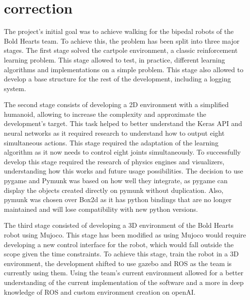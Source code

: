 \documentclass[12pt, a4paper]{article}
\begin{document}
\section{correction}
The project's initial goal was to achieve walking for the bipedal robots of the Bold Hearts team. 
To achieve this, the problem has been split into three major stages. The first stage solved the cartpole environment, a classic reinforcement learning problem.
This stage allowed to test, in practice, different learning algorithms and implementations on a simple problem. 
This stage also allowed to develop a base structure for the rest of the development, including a logging system.

The second stage consists of developing a 2D environment with a simplified humanoid, allowing to increase the complexity and approximate the development's target.
This task helped to better understand the Keras API and neural networks as it required research to understand how to output eight simultaneous actions.
This stage required the adaptation of the learning algorithm as it now needs to control eight joints simultaneously.
To successfully develop this stage required the research of physics engines and visualizers, understanding how this works and future usage possibilities. 
The decision to use pygame and Pymunk was based on how well they integrate, as pygame can display the objects created directly on pymunk without duplication. Also, pymunk was chosen over Box2d as it has python bindings that are no longer maintained and will lose compatibility with new python versions.


The third stage consisted of developing a 3D environment of the Bold Hearts robot using Mujoco. 
This stage has been modified as using Mujoco would require developing a new control interface for the robot, which would fall outside the scope given the time constraints.
To achieve this stage, train the robot in a 3D environment, the development shifted to use gazebo and ROS as the team is currently using them. 
Using the team's current environment allowed for a better understanding of the current implementation of the software and a more in deep knowledge of ROS and custom environment creation on openAI.
\end{document}
